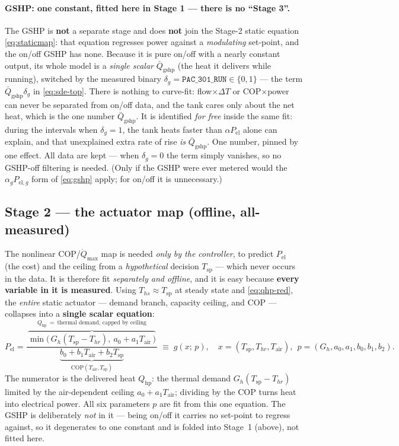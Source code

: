 \documentclass[11pt,a4paper]{article}
\newcommand{\Qmax}{\dot{Q}_{\max}}
\newcommand{\Ths}{T_{hs}}          %
\newcommand{\Thr}{T_{hr}}          %
\newcommand{\Tsp}{T_{\mathrm{sp}}} %
\newcommand{\Tair}{T_{\mathrm{air}}}
\newcommand{\Qhp}{Q_{\mathrm{hp}}}
\newcommand{\Pel}{P_{\mathrm{el}}}
\newcommand{\code}[1]{\texttt{#1}}
\begin{document}
\paragraph{GSHP: one constant, fitted here in Stage 1 --- there is no ``Stage 3''.}
The GSHP is \textbf{not} a separate stage and does \textbf{not} join the Stage-2
static equation \eqref{eq:staticmap}: that equation regresses power against a
\emph{modulating} set-point, and the on/off GSHP has none. Because it is pure on/off
with a nearly constant output, its whole model is a
\emph{single scalar} $\bar Q_{\mathrm{gshp}}$ (the heat it delivers while running),
switched by the measured binary $\delta_g=\code{PAC\_301\_RUN}\in\{0,1\}$ ---
the term $\bar Q_{\mathrm{gshp}}\delta_g$ in \eqref{eq:sde-top}. There is nothing to
curve-fit: flow$\times\Delta T$ or COP$\times$power can never be separated from
on/off data, and the tank cares only about the net heat, which is the one number
$\bar Q_{\mathrm{gshp}}$. It is identified \emph{for free} inside the same fit:
during the intervals when $\delta_g=1$, the tank heats faster than $\alpha\Pel$
alone can explain, and that unexplained extra rate of rise \emph{is}
$\bar Q_{\mathrm{gshp}}$. One number, pinned by one effect. All data are kept ---
when $\delta_g=0$ the term simply vanishes, so no GSHP-off filtering is needed.
(Only if the GSHP were ever metered would the $\alpha_g P_{\mathrm{el},g}$ form of
\eqref{eq:gshp} apply; for on/off it is unnecessary.)

\subsection{Stage 2 --- the actuator map (offline, all-measured)}
The nonlinear COP/$\Qmax$ map is needed \emph{only by the controller}, to predict
$\Pel$ (the cost) and the ceiling from a \emph{hypothetical} decision $\Tsp$ ---
which never occurs in the data. It is therefore fit \emph{separately and offline},
and it is easy because \textbf{every variable in it is measured}. Using
$\Ths\approx\Tsp$ at steady state and \eqref{eq:qhp-red}, the \emph{entire} static
actuator --- demand branch, capacity ceiling, and COP --- collapses into a
\textbf{single scalar equation}:
\begin{equation}
  \Pel = \frac{\,\overbrace{\min\!\big(\,G_h(\Tsp-\Thr),\ a_0+a_1\Tair\,\big)}^{\Qhp\ =\ \text{thermal demand, capped by ceiling}}\,}
             {\underbrace{b_0+b_1\Tair+b_2\Tsp}_{\mathrm{COP}(\Tair,\Tsp)}}
  \;\equiv\; g(x;\,p), \quad
  x=(\Tsp,\Thr,\Tair),\ \ p=(G_h,a_0,a_1,b_0,b_1,b_2).
  \label{eq:staticmap}
\end{equation}
The numerator is the delivered heat $\Qhp$: the thermal demand $G_h(\Tsp-\Thr)$
limited by the air-dependent ceiling $a_0+a_1\Tair$; dividing by the COP turns heat
into electrical power. All six parameters $p$ are fit from this one equation. The
GSHP is deliberately \emph{not} in it --- being on/off it carries no set-point to
regress against, so it degenerates to one constant and is folded into Stage~1
(above), not fitted here.
\end{document}
